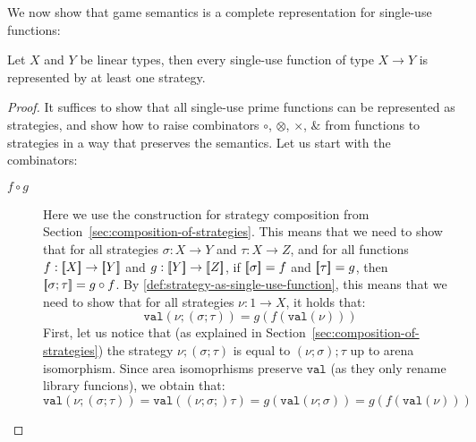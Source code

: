 We now show that game semantics is a complete representation for single-use functions:
\begin{lemma}\label{lem:su-strategies-complete}
    Let $X$ and $Y$ be linear types, then every single-use function of type $X \to Y$ is represented by at least one strategy. 
\end{lemma}
\begin{proof}
    It suffices to show that all single-use prime functions can be represented as strategies,
    and show how to raise combinators $\circ$, $\otimes$, $\times$, $\&$ from functions to 
    strategies in a way that preserves the semantics. Let us start with the combinators:
    \begin{description}
        \item[$f \circ g$] Here we use the construction for strategy composition from Section~\ref{sec:composition-of-strategies}.
        This means that we need to show that for all strategies $\sigma : X \to Y$ and $\tau: X \to Z$, 
        and for all functions $f : [{\kern-0.45ex}[X]{\kern-0.45ex}] \to [{\kern-0.45ex}[Y]{\kern-0.45ex}]$ and $g: [{\kern-0.45ex}[Y]{\kern-0.45ex}] \to [{\kern-0.45ex}[Z]{\kern-0.45ex}]$,
        if $[{\kern-0.45ex}[\sigma]{\kern-0.45ex}] = f$ and $[{\kern-0.45ex}[\tau]{\kern-0.45ex}] =g$, then $[{\kern-0.45ex}[\sigma; \tau]{\kern-0.45ex}] = g \circ f$. By \ref{def:strategy-as-single-use-function}, 
        this means that we need to show that for all strategies $\nu : 1 \to X$, it holds that: 
        \[ \mathtt{val}(\nu; (\sigma; \tau)) = g(f(\mathtt{val}(\nu))) \]
        First, let us notice that (as explained in Section~\ref{sec:composition-of-strategies}) 
        the strategy $\nu; (\sigma; \tau)$ is equal to $(\nu; \sigma); \tau$ up to arena isomorphism. 
        Since area isomoprhisms preserve $\mathtt{val}$ (as they only rename library funcions), 
        we obtain that:
        \[ \mathtt{val}(\nu; (\sigma; \tau)) = \mathtt{val}((\nu; \sigma;) \tau) = g(\mathtt{val}(\nu; \sigma)) = g(f(\mathtt{val}(\nu))) \]


\end{description}
\end{proof}
